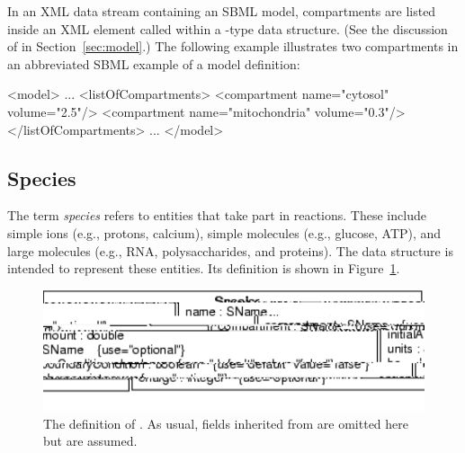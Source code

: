 \documentclass[10pt]{cekarticle}
\newcommand{\vref}[1]{\ref{#1}}
\begin{document}
In an XML data stream containing an SBML model, compartments are listed
inside an XML element called  within a
-type data structure.  (See the discussion of  in
Section~\ref{sec:model}.)  The following example illustrates two
compartments in an abbreviated SBML example of a model definition:

\begin{example}
<model>
    ...
    <listOfCompartments>
        <compartment name="cytosol" volume="2.5"/>
        <compartment name="mitochondria" volume="0.3"/>
    </listOfCompartments>
    ...
</model>
\end{example}


\subsection{Species}
\label{sec:species}

The term \emph{species} refers to entities that take part in reactions.
These include simple ions (e.g., protons, calcium), simple molecules (e.g.,
glucose, ATP), and large molecules (e.g., RNA, polysaccharides, and
proteins).  The  data structure is intended to represent
these entities.  Its definition is shown in Figure~\vref{fig:species}.

\begin{figure}[htb]
  \centering
  \includegraphics[scale = 0.68]{species}
  \caption{The definition of .  As usual, fields inherited from
     are omitted here but are assumed.}
  \label{fig:species}
\end{figure}
\end{document}
